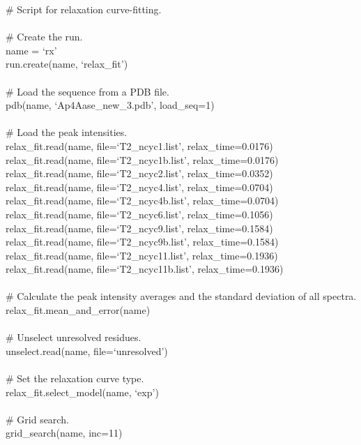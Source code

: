 \begin{exampleenv}
\# Script for relaxation curve-fitting. \\
 \\
\# Create the run. \\
name = `rx' \\
run.create(name, `relax\_fit') \\
 \\
\# Load the sequence from a PDB file. \\
pdb(name, `Ap4Aase\_new\_3.pdb', load\_seq=1) \\
 \\
\# Load the peak intensities. \\
relax\_fit.read(name, file=`T2\_ncyc1.list', relax\_time=0.0176) \\
relax\_fit.read(name, file=`T2\_ncyc1b.list', relax\_time=0.0176) \\
relax\_fit.read(name, file=`T2\_ncyc2.list', relax\_time=0.0352) \\
relax\_fit.read(name, file=`T2\_ncyc4.list', relax\_time=0.0704) \\
relax\_fit.read(name, file=`T2\_ncyc4b.list', relax\_time=0.0704) \\
relax\_fit.read(name, file=`T2\_ncyc6.list', relax\_time=0.1056) \\
relax\_fit.read(name, file=`T2\_ncyc9.list', relax\_time=0.1584) \\
relax\_fit.read(name, file=`T2\_ncyc9b.list', relax\_time=0.1584) \\
relax\_fit.read(name, file=`T2\_ncyc11.list', relax\_time=0.1936) \\
relax\_fit.read(name, file=`T2\_ncyc11b.list', relax\_time=0.1936) \\
 \\
\# Calculate the peak intensity averages and the standard deviation of all spectra. \\
relax\_fit.mean\_and\_error(name) \\
 \\
\# Unselect unresolved residues. \\
unselect.read(name, file=`unresolved') \\
 \\
\# Set the relaxation curve type. \\
relax\_fit.select\_model(name, `exp') \\
 \\
\# Grid search. \\
grid\_search(name, inc=11) \\

\end{exampleenv}
